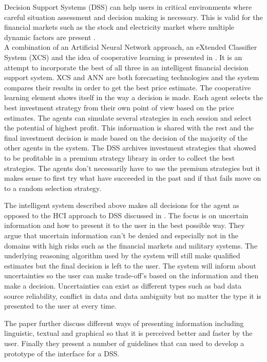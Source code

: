 Decision Support Systems (DSS) can help users in critical environments where careful situation assessment and decision making is necessary. This is valid for the financial markets such as the stock and electricity market where multiple dynamic factors are present \cite{UncertainInformation}.
\\[0.5cm]
A combination of an Artificial Neural Network approach, an eXtended Classifier System (XCS) and the idea of cooperative learning is presented in \cite{groupLearningDS}. It is an attempt to incorporate the best of all three in an intelligent financial decision support system. XCS and ANN are both forecasting technologies and the system compares their results in order to get the best price estimate. The cooperative learning element shows itself in the way a decision is made. Each agent selects the best investment strategy from their own point of view based on the price estimates. The agents can simulate several strategies in each session and select the potential of highest profit. This information is shared with the rest and the final investment decision is made based on the decision of the majority of the other agents in the system. The DSS archives investment strategies that showed to be profitable in a premium strategy library in order to collect the best strategies. The agents don't necessarily have to use the premium strategies but it makes sense to first try what have succeeded in the past and if that fails move on to a random selection strategy. 

The intelligent system described above makes all decisions for the agent as opposed to the HCI approach to DSS discussed in \cite{UncertainInformation}. The focus is on uncertain information and how to present it to the user in the best possible way. They argue that uncertain information can't be denied and especially not in the domains with high risks such as the financial markets and military systems. The underlying reasoning algorithm used by the system will still make qualified estimates but the final decision is left to the user. The system will inform about uncertainties so the user can make trade-off's based on the information and then make a decision. Uncertainties can exist as different types such as bad data source reliability, conflict in data and data ambiguity but no matter the type it is presented to the user at every time. 

The paper \cite{UncertainInformation} further discuss different ways of presenting information including linguistic, textual and graphical so that it is perceived better and faster by the user. Finally they present a number of guidelines that can used to develop a prototype of the interface for a DSS.